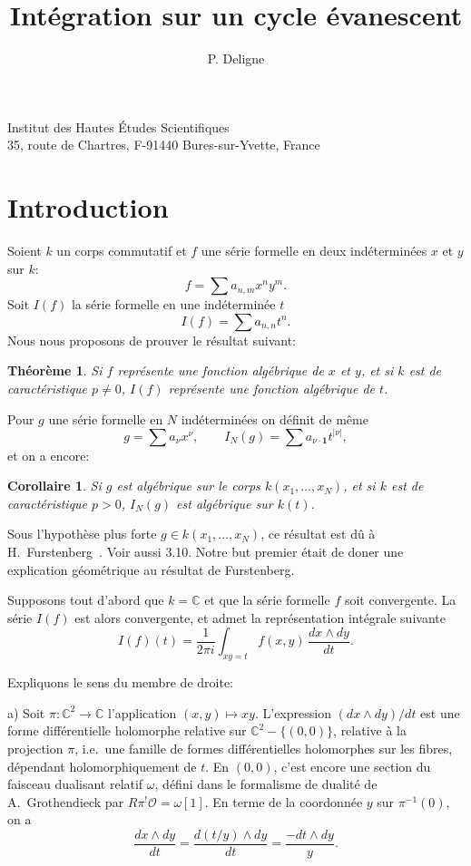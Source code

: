 \documentclass[12pt,a4paper]{article}
\title{Intégration sur un cycle évanescent}
\author{P. Deligne}
\date{}
\theoremstyle{plain}
\newtheorem{theorem}{Théorème}
\newtheorem{corollary}{Corollaire}
\theoremstyle{definition}
\theoremstyle{remark}
\newcommand{\CC}{\mathbb{C}}
\newcommand{\OO}{\mathcal{O}}
\providecommand{\CC}{\mathbb{C}}
\begin{document}
\maketitle

\begin{center}
Institut des Hautes Études Scientifiques\\
35, route de Chartres, F-91440 Bures-sur-Yvette, France
\end{center}

\section*{Introduction}

Soient $k$ un corps commutatif et $f$ une série formelle en deux indéterminées $x$
et $y$ sur $k$:
\[
f=\sum a_{n,m} x^n y^m .
\]
Soit $I(f)$ la série formelle en une indéterminée $t$
\[
I(f)=\sum a_{n,n} t^n .
\]
Nous nous proposons de prouver le résultat suivant:

\begin{theorem}
Si $f$ représente une fonction algébrique de $x$ et $y$, et si $k$ est de
caractéristique $p\neq 0$, $I(f)$ représente une fonction algébrique de $t$.
\end{theorem}

Pour $g$ une série formelle en $N$ indéterminées on définit de même
\[
g=\sum a_\nu x^\nu, \qquad I_N(g)=\sum a_{\nu\cdot\mathbf{1}} t^{|\nu|},
\]
et on a encore:

\begin{corollary}
Si $g$ est algébrique sur le corps $k(x_1,\dots,x_N)$, et si $k$ est de
caractéristique $p>0$, $I_N(g)$ est algébrique sur $k(t)$.
\end{corollary}

Sous l'hypothèse plus forte $g\in k(x_1,\dots,x_N)$, ce résultat est dû à
H.~Furstenberg~\cite{Furstenberg}. Voir aussi 3.10. Notre but premier était de
doner une explication géométrique au résultat de Furstenberg.

Supposons tout d'abord que $k=\CC$ et que la série formelle $f$ soit convergente.
La série $I(f)$ est alors convergente, et admet la représentation intégrale suivante
\begin{equation}\label{eq:1}
I(f)(t)=\frac{1}{2\pi i}\int_{xy=t} f(x,y)\,\frac{dx\wedge dy}{dt}.
\end{equation}

Expliquons le sens du membre de droite:

a) Soit $\pi:\CC^2\to\CC$ l'application $(x,y)\mapsto xy$. L'expression
$(dx\wedge dy)/dt$ est une forme différentielle holomorphe relative sur
$\CC^2-\{(0,0)\}$, relative à la projection $\pi$, i.e.\ une famille de formes
différentielles holomorphes sur les fibres, dépendant holomorphiquement de $t$.
En $(0,0)$, c'est encore une section du faisceau dualisant relatif $\omega$, défini
dans le formalisme de dualité de A.\ Grothendieck par
$R\pi^!\OO=\omega[1]$. En terme de la coordonnée $y$ sur $\pi^{-1}(0)$, on a
\[
\frac{dx\wedge dy}{dt}=\frac{d(t/y)\wedge dy}{dt}=\frac{-dt\wedge dy}{y}.
\]
\end{document}

